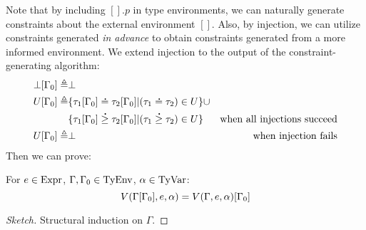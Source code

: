 Note that by including $[].p$ in type environments, we can naturally generate constraints about the external environment $[]$.
Also, by injection, we can utilize constraints generated \emph{in advance} to obtain constraints generated from a more informed environment.
We extend injection to the output of the constraint-generating algorithm:
\begin{align*}
  \bot[\Gamma_0] \triangleq & \bot                                                                                                          \\
  U[\Gamma_0]    \triangleq & \{\tau_1[\Gamma_0]\overset{\,_{\mbox{\Large .}}}{=}\tau_2[\Gamma_0]|(\tau_1\overset{\,_{\mbox{\Large .}}}{=}\tau_2)\in U\}\cup                                      \\
                             & \{\tau_1[\Gamma_0]\overset{\,_{\mbox{\Large .}}}{\ge}\tau_2[\Gamma_0]|(\tau_1\overset{\,_{\mbox{\Large .}}}{\ge}\tau_2)\in U\} & \text{when all injections succeed} \\
  U[\Gamma_0]    \triangleq & \bot                                                                     & \text{when injection fails}
\end{align*}
Then we can prove:
\begin{theorem}[Advance]\normalfont
  For $e\in\text{Expr}$, $\Gamma,\Gamma_0\in\text{TyEnv}$, $\alpha\in\text{TyVar}$:
  \[V(\Gamma[\Gamma_0],e,\alpha)=V(\Gamma,e,\alpha)[\Gamma_0]\]
\end{theorem}
\begin{proof}[Sketch]
  Structural induction on $\Gamma$.
\end{proof}
